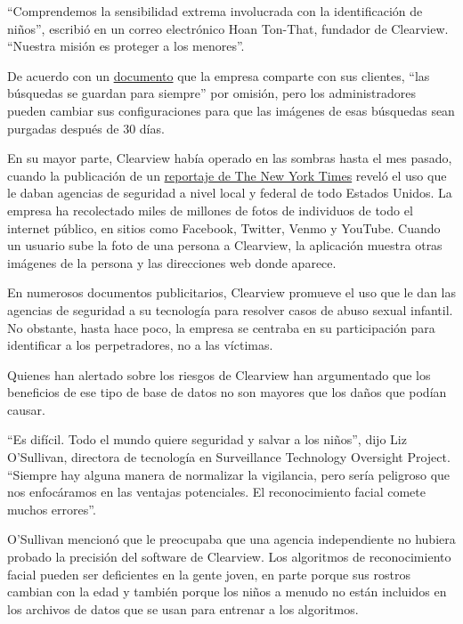 ``Comprendemos la sensibilidad extrema involucrada con la identificación
de niños'', escribió en un correo electrónico Hoan Ton-That, fundador de
Clearview. ``Nuestra misión es proteger a los menores''.

De acuerdo con un
\href{https://int.graylady3jvrrxbe.onion/data/documenthelper/6690-clearview-faq/c8b081a0bcca12e7903a/optimized/full.pdf\#page=1}{documento}
que la empresa comparte con sus clientes, ``las búsquedas se guardan
para siempre'' por omisión, pero los administradores pueden cambiar sus
configuraciones para que las imágenes de esas búsquedas sean purgadas
después de 30 días.

En su mayor parte, Clearview había operado en las sombras hasta el mes
pasado, cuando la publicación de un
\href{https://www.nytimes3xbfgragh.onion/es/2020/01/20/espanol/negocios/clearview-reconocimiento-facial.html}{reportaje
de The New York Times} reveló el uso que le daban agencias de seguridad
a nivel local y federal de todo Estados Unidos. La empresa ha
recolectado miles de millones de fotos de individuos de todo el internet
público, en sitios como Facebook, Twitter, Venmo y YouTube. Cuando un
usuario sube la foto de una persona a Clearview, la aplicación muestra
otras imágenes de la persona y las direcciones web donde aparece.

En numerosos documentos publicitarios, Clearview promueve el uso que le
dan las agencias de seguridad a su tecnología para resolver casos de
abuso sexual infantil. No obstante, hasta hace poco, la empresa se
centraba en su participación para identificar a los perpetradores, no a
las víctimas.

Quienes han alertado sobre los riesgos de Clearview han argumentado que
los beneficios de ese tipo de base de datos no son mayores que los daños
que podían causar.

``Es difícil. Todo el mundo quiere seguridad y salvar a los niños'',
dijo Liz O'Sullivan, directora de tecnología en Surveillance Technology
Oversight Project. ``Siempre hay alguna manera de normalizar la
vigilancia, pero sería peligroso que nos enfocáramos en las ventajas
potenciales. El reconocimiento facial comete muchos errores''.

O'Sullivan mencionó que le preocupaba que una agencia independiente no
hubiera probado la precisión del software de Clearview. Los algoritmos
de reconocimiento facial pueden ser deficientes en la gente joven, en
parte porque sus rostros cambian con la edad y también porque los niños
a menudo no están incluidos en los archivos de datos que se usan para
entrenar a los algoritmos.

